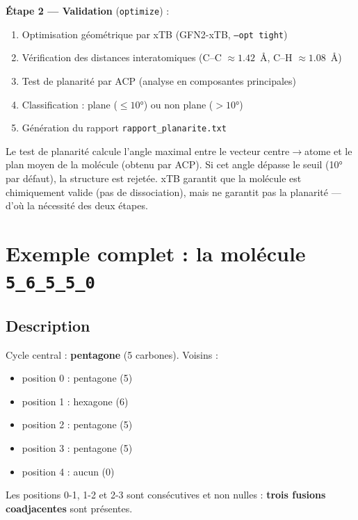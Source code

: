 \documentclass[a4paper,12pt]{article}
\begin{document}
\textbf{Étape 2 — Validation} (\texttt{optimize}) :
\begin{enumerate}
  \item Optimisation géométrique par xTB (GFN2-xTB, \texttt{--opt tight})
  \item Vérification des distances interatomiques (C--C $\approx 1.42$~Å, C--H $\approx 1.08$~Å)
  \item Test de planarité par ACP (analyse en composantes principales)
  \item Classification : plane ($\leq 10°$) ou non plane ($> 10°$)
  \item Génération du rapport \texttt{rapport\_planarite.txt}
\end{enumerate}

\begin{remarque}
  Le test de planarité calcule l'angle maximal entre le vecteur centre$\to$atome et le plan
  moyen de la molécule (obtenu par ACP). Si cet angle dépasse le seuil (10° par défaut),
  la structure est rejetée. xTB garantit que la molécule est chimiquement valide (pas de
  dissociation), mais ne garantit pas la planarité — d'où la nécessité des deux étapes.
\end{remarque}

\section{Exemple complet : la molécule \texttt{5\_6\_5\_5\_0}}

\subsection{Description}

Cycle central : \textbf{pentagone} (5 carbones). Voisins :
\begin{itemize}
  \item position 0 : pentagone (5)
  \item position 1 : hexagone (6)
  \item position 2 : pentagone (5)
  \item position 3 : pentagone (5)
  \item position 4 : aucun (0)
\end{itemize}

Les positions 0-1, 1-2 et 2-3 sont consécutives et non nulles : \textbf{trois fusions
coadjacentes} sont présentes.
\end{document}
